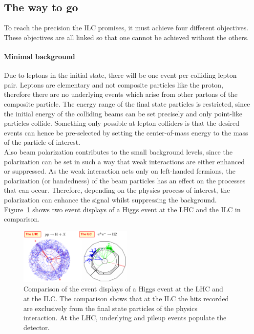 \subsection{The way to go}
To reach the precision the ILC promises, it must achieve four different objectives.
These objectives are all linked so that one cannot be achieved without the others.

\paragraph{Minimal background}
Due to leptons in the initial state, there will be one event per colliding lepton pair.
Leptons are elementary and not composite particles like the proton, therefore there are no underlying events which arise from other partons of the composite particle.
The energy range of the final state particles is restricted, since the initial energy of the colliding beams can be set precisely and only point-like particles collide.
Something only possible at lepton colliders is that the desired events can hence be pre-selected by setting the center-of-mass energy to the mass of the particle of interest.\\
Also beam polarization contributes to the small background levels, since the polarization can be set in such a way that weak interactions are either enhanced or suppressed.
As the weak interaction acts only on left-handed fermions, the polarization (or handedness) of the beam particles has an effect on the processes that can occur.
Therefore, depending on the physics process of interest, the polarization can enhance the signal whilst suppressing the background.\\
Figure~\ref{fig:Cleanliness} shows two event displays of a Higgs event at the LHC and the ILC in comparison.
\begin{figure}[H]
\centering
\includegraphics[width=0.5\textwidth]{Figures/Cleanliness.png}
\caption[Clean environment at the ILC]{Comparison of the event displays of a Higgs event at the  LHC and at the ILC.\cite[p. 4]{ILCPhysics_Thomson}
The comparison shows that at the ILC the hits recorded are exclusively from the final state particles of the physics interaction.
At the LHC, underlying and pileup events populate the detector.}
\label{fig:Cleanliness}
\end{figure}


